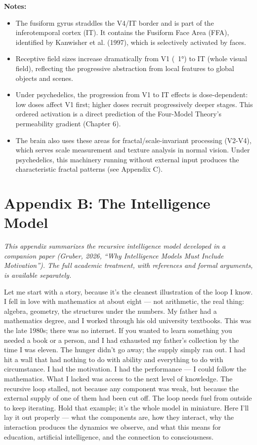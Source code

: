 \documentclass[11pt, twoside, openright]{book}
\begin{document}
\textbf{Notes:}
\begin{itemize}
  \item The fusiform gyrus straddles the V4/\allowbreak{}IT border and is part of the inferotemporal cortex (IT). It contains the Fusiform Face Area (FFA), identified by Kanwisher et al. (1997), which is selectively activated by faces.
  \item Receptive field sizes increase dramatically from V1 (~1°) to IT (whole visual field), reflecting the progressive abstraction from local features to global objects and scenes.
  \item Under psychedelics, the progression from V1 to IT effects is dose-dependent: low doses affect V1 first; higher doses recruit progressively deeper stages. This ordered activation is a direct prediction of the Four-Model Theory's permeability gradient (Chapter 6).
  \item The brain also uses these areas for fractal/\allowbreak{}scale-invariant processing (V2-V4), which serves scale measurement and texture analysis in normal vision. Under psychedelics, this machinery running without external input produces the characteristic fractal patterns (see Appendix C).
\end{itemize}


\chapter*{Appendix B: The Intelligence Model}

\textit{This appendix summarizes the recursive intelligence model developed in a companion paper (Gruber, 2026, ``Why Intelligence Models Must Include Motivation''). The full academic treatment, with references and formal arguments, is available separately.}

Let me start with a story, because it's the cleanest illustration of the loop I know. I fell in love with mathematics at about eight --- not arithmetic, the real thing: algebra, geometry, the structures under the numbers. My father had a mathematics degree, and I worked through his old university textbooks. This was the late 1980s; there was no internet. If you wanted to learn something you needed a book or a person, and I had exhausted my father's collection by the time I was eleven. The hunger didn't go away; the supply simply ran out. I had hit a wall that had nothing to do with ability and everything to do with circumstance. I had the motivation. I had the performance --- I could follow the mathematics. What I lacked was access to the next level of knowledge. The recursive loop stalled, not because any component was weak, but because the external supply of one of them had been cut off. The loop needs fuel from outside to keep iterating. Hold that example; it's the whole model in miniature. Here I'll lay it out properly --- what the components are, how they interact, why the interaction produces the dynamics we observe, and what this means for education, artificial intelligence, and the connection to consciousness.
\end{document}
